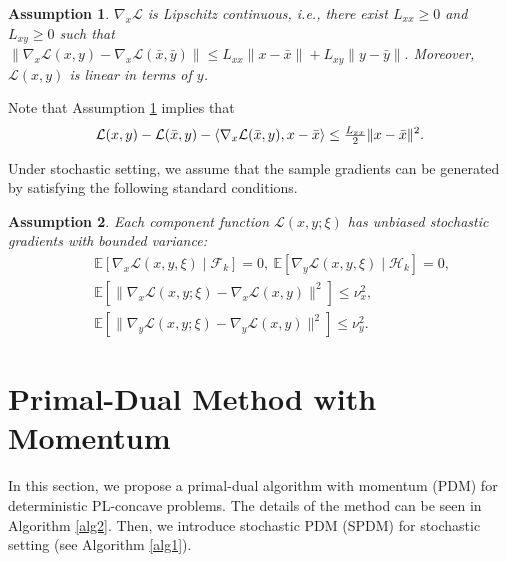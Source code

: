 \documentclass[letterpaper,11 pt]{article}
\newtheorem{assumption}{Assumption}
\def\ml{\mathcal L}
\newcommand{\mor}[1]{{\color{black}#1}}
\newcommand{\zizi}[1]{{\color{black}#1}}
\begin{document}

\begin{assumption}\label{assump1} $\nabla_x\ml$ is Lipschitz continuous, i.e., there exist $L_{xx}\geq0$ and $L_{xy}\geq0$ such that
$ \|\nabla_x \ml(x,y)- \nabla_x \ml(\bar x,\bar y)\| \leq{L_{xx}} \|x-\bar x\|+{L_{xy}} \|y-\bar y\|.$
Moreover, $\ml(x,y)$ is linear in terms of $y$.
 \end{assumption}
 Note that Assumption \ref{assump1} implies that 
 \begin{align}\label{assump3}
 \ml(x,y)-\ml(\bar x,y)-\langle \nabla_x \ml(\bar x,y),x-\bar x\rangle \leq \tfrac{L_{xx}}{2} \mor{\|x-\bar x\|^2}.
 \end{align}
 
 Under stochastic setting, we assume that the sample gradients can be generated \zizi{by} satisfying the following standard conditions.
 
 \begin{assumption}\label{assump:stoch}
 Each component function $\ml(x,y;\xi)$ has unbiased stochastic gradients with bounded variance:
\begin{align*}\quad &\mathbb E[\nabla_x\ml(x,y,\xi)\mid \mathcal F_k]=0,\ \mathbb E[\nabla_y\ml(x,y,\xi)\mid \mathcal H_k]=0,\\
&\mathbb E[\|\nabla_x\ml(x,y;\xi)-\nabla_x\ml(x,y)\|^2]\leq \nu^2_x,\\
&\mathbb E[\|\nabla_y\ml(x,y;\xi)-\nabla_y\ml(x,y)\|^2]\leq \nu^2_y.
\end{align*}
 \end{assumption}
 
 

\section{Primal-Dual Method with Momentum}\label{sec:alg}
In this section, we propose a primal-dual algorithm with momentum (PDM) for deterministic PL-concave problems. The details of the method can be seen in Algorithm \ref{alg2}. Then, we introduce stochastic PDM (SPDM) for stochastic setting (see Algorithm \ref{alg1}). 
\end{document}
